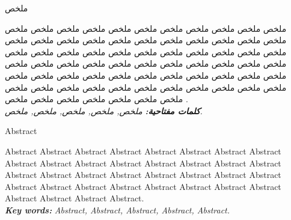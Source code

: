 \documentclass[12pt,a4paper]{report}
\begin{document}
	\newpage
	\thispagestyle{empty}
	\begin{center} \end{center}
	\vspace{0.01cm}
	
	\begin{center} {\LARGE ملخص  } \end{center}
	\par ملخص ملخص ملخص ملخص ملخص ملخص ملخص ملخص ملخص ملخص ملخص ملخص ملخص ملخص ملخص ملخص ملخص ملخص ملخص ملخص ملخص ملخص ملخص ملخص ملخص ملخص ملخص ملخص ملخص ملخص ملخص ملخص ملخص ملخص ملخص ملخص ملخص ملخص ملخص ملخص ملخص ملخص ملخص ملخص ملخص ملخص ملخص ملخص ملخص ملخص ملخص ملخص ملخص ملخص ملخص ملخص ملخص ملخص ملخص ملخص ملخص ملخص ملخص ملخص ملخص ملخص ملخص ملخص ملخص ملخص ملخص ملخص ملخص .\\
	\textbf{\textit{كلمات مفتاحية:}} \textit{ملخص, ملخص, ملخص, ملخص, ملخص.}
	
	\vspace{2cm}
	
	\begin{center} {\LARGE Abstract} \end{center}
	\par Abstract Abstract Abstract  Abstract Abstract Abstract Abstract Abstract Abstract Abstract Abstract Abstract Abstract Abstract Abstract Abstract Abstract Abstract Abstract Abstract Abstract Abstract Abstract Abstract Abstract Abstract Abstract Abstract Abstract Abstract Abstract Abstract Abstract Abstract Abstract Abstract.\\
	\textbf{\textit{Key words:}} \textit{Abstract, Abstract, Abstract, Abstract, Abstract.}
	
	\thispagestyle{empty}
\end{document}
